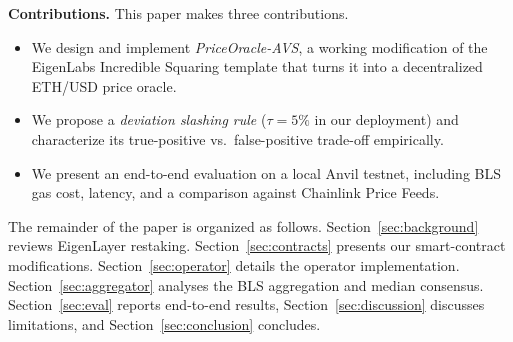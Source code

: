 \textbf{Contributions.}  This paper makes three contributions.
\begin{itemize}
  \item We design and implement \emph{PriceOracle-AVS}, a working
        modification of the EigenLabs Incredible Squaring template
        that turns it into a decentralized ETH/USD price oracle.
  \item We propose a \emph{deviation slashing rule} ($\tau{=}5\%$
        in our deployment) and characterize its true-positive vs.\
        false-positive trade-off empirically.
  \item We present an end-to-end evaluation on a local Anvil
        testnet, including BLS gas cost, latency, and a comparison
        against Chainlink Price Feeds.
\end{itemize}

The remainder of the paper is organized as follows.
Section~\ref{sec:background} reviews EigenLayer restaking.
Section~\ref{sec:contracts} presents our smart-contract modifications.
Section~\ref{sec:operator} details the operator implementation.
Section~\ref{sec:aggregator} analyses the BLS aggregation and median
consensus.  Section~\ref{sec:eval} reports end-to-end results,
Section~\ref{sec:discussion} discusses limitations, and
Section~\ref{sec:conclusion} concludes.
